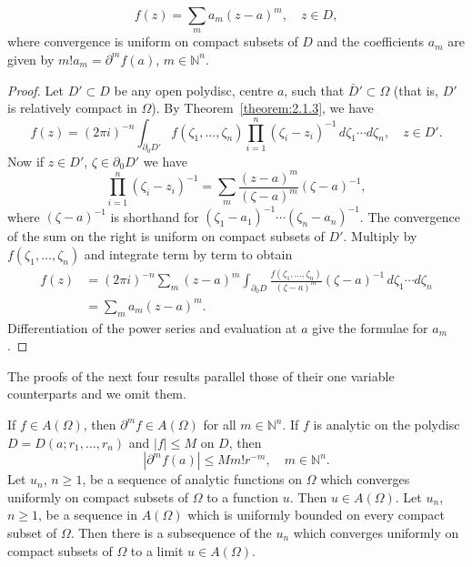 \[f(z)=\sum_m a_m(z-a)^m,\quad z\in D,\]
where convergence is uniform on compact subsets of $D$ and the coefficients $a_m$ are given by $m!a_m=\partial^m f(a)$, $m\in\mathbb N^n$.
\begin{proof}
Let $D'\subset D$ be any open polydisc, centre $a$, such that $\bar D'\subset\Omega$ (that is, $D'$ is relatively compact in $\Omega$). By Theorem~\ref{theorem:2.1.3}, we have
\[f(z)=(2\pi i)^{-n}\int_{\partial_0D'}f(\zeta_1,\ldots,\zeta_n)\prod_{i=1}^n(\zeta_i-z_i)^{-1}\,d\zeta_1\cdots d\zeta_n,\quad z\in D'.\]
Now if $z\in D'$, $\zeta\in\partial_0D'$ we have
\[\prod_{i=1}^n(\zeta_i-z_i)^{-1}=\sum_m\frac{(z-a)^m}{(\zeta-a)^m}(\zeta-a)^{-1},\]
where $(\zeta-a)^{-1}$ is shorthand for $(\zeta_1-a_1)^{-1}\cdots(\zeta_n-a_n)^{-1}$. The convergence of the sum on the right is uniform on compact subsets of $D'$. Multiply by $f(\zeta_1,\ldots,\zeta_n)$ and integrate term by term to obtain
\begin{align*}
f(z)&=(2\pi i)^{-n}\sum_m(z-a)^m\int_{\partial_0D}\frac{f(\zeta_1,\ldots,\zeta_n)}{(\zeta-a)^m}(\zeta-a)^{-1}\,d\zeta_1\cdots d\zeta_n\\
&=\sum_m a_m(z-a)^m.
\end{align*}
Differentiation of the power series and evaluation at $a$ give the formulae for $a_m$.
\end{proof}
The proofs of the next four results parallel those of their one variable counterparts and we omit them.

 If $f\in A(\Omega)$, then $\partial^m f\in A(\Omega)$ for all $m\in\mathbb N^n$.
 If $f$ is analytic on the polydisc $D=D(a;r_1,\ldots,r_n)$ and $|f|\leq M$ on $D$, then
\[|\partial^m f(a)|\leq Mm!r^{-m},\quad m\in\mathbb N^n.\]
 Let $u_n$, $n\geq1$, be a sequence of analytic functions on $\Omega$ which converges uniformly on compact subsets of $\Omega$ to a function $u$. Then $u\in A(\Omega)$.
 Let $u_n$, $n\geq1$, be a sequence in $A(\Omega)$ which is uniformly bounded on every compact subset of $\Omega$. Then there is a subsequence of the $u_n$ which converges uniformly on compact subsets of $\Omega$ to a limit $u\in A(\Omega)$.
